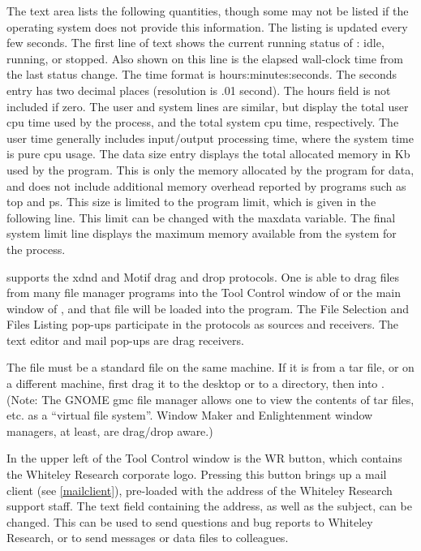 The text area lists the following quantities, though some may not be
listed if the operating system does not provide this information. 
The listing is updated every few seconds.  The first line of text
shows the current running status of {\WRspice}:  idle, running, or
stopped.  Also shown on this line is the elapsed wall-clock time
from the last status change.  The time format is
hours:minutes:seconds.  The seconds entry has two decimal places
(resolution is .01 second).  The hours field is not included if
zero.  The {\cb user} and {\cb system} lines are similar, but display
the total user cpu time used by the process, and the total system cpu
time, respectively.  The user time generally includes input/output
processing time, where the system time is pure cpu usage.  The {\cb
data size} entry displays the total allocated memory in Kb used by the
program.  This is only the memory allocated by the program for data,
and does not include additional memory overhead reported by programs
such as {\vt top} and {\vt ps}.  This size is limited to the {\cb
program limit}, which is given in the following line.  This limit can
be changed with the {\et maxdata} variable.  The final {\cb system
limit} line displays the maximum memory available from the system for
the process.

{\WRspice} supports the {\et xdnd} and {\et Motif} drag and drop
protocols.  One is able to drag files from many file manager programs
into the {\cb Tool Control} window of {\WRspice} or the main window of
{\Xic}, and that file will be loaded into the program.  The File
Selection and Files Listing pop-ups participate in the protocols as
sources and receivers.  The text editor and mail pop-ups are drag
receivers.

The file must be a standard file on the same machine.  If it is from a
tar file, or on a different machine, first drag it to the desktop or
to a directory, then into {\WRspice}.  (Note:  The GNOME {\vt gmc}
file manager allows one to view the contents of tar files, etc.  as a
``virtual file system''.  Window Maker and Enlightenment window
managers, at least, are drag/drop aware.)

In the upper left of the {\cb Tool Control} window is the {\cb WR}
button, which contains the Whiteley Research corporate logo.  Pressing
this button brings up a mail client (see \ref{mailclient}), pre-loaded
with the address of the Whiteley Research support staff.  The text
field containing the address, as well as the subject, can be changed. 
This can be used to send questions and bug reports to Whiteley
Research, or to send messages or data files to colleagues.

